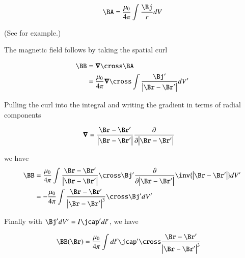 \begin{align*}
\BA = \frac{\mu_0}{4 \pi} \int \frac{\Bj}{r} dV
\end{align*}

(See \cite{schwartz1987pe} for example.)

The magnetic field follows by taking the spatial curl

\begin{align*}
\BB
&= \spacegrad \cross \BA \\
&= \frac{\mu_0}{4 \pi} \spacegrad \cross \int \frac{\Bj'}{\Abs{\Br-\Br'}} dV'
\end{align*}

Pulling the curl into the integral and writing the gradient in terms of radial components

\begin{align*}
\spacegrad &= \frac{\Br - \Br'}{\Abs{\Br - \Br'}} \PD{\Abs{\Br - \Br'}}{}
\end{align*}

we have
\begin{align*}
\BB
&= \frac{\mu_0}{4 \pi} \int
\frac{\Br - \Br'}{\Abs{\Br - \Br'}} \cross \Bj' \PD{\Abs{\Br - \Br'}}{}{\inv{ \Abs{\Br-\Br'} }} dV' \\
&= -\frac{\mu_0}{4 \pi} \int
\frac{\Br - \Br'}{\Abs{\Br - \Br'}^3} \cross \Bj' dV' \\
\end{align*}

Finally with $\Bj' dV' = I \jcap' dl'$, we have

\begin{align}
\BB(\Br) &= \frac{\mu_0}{4 \pi} \int dl' \jcap' \cross \frac{\Br - \Br'}{\Abs{\Br - \Br'}^3}
\end{align}

